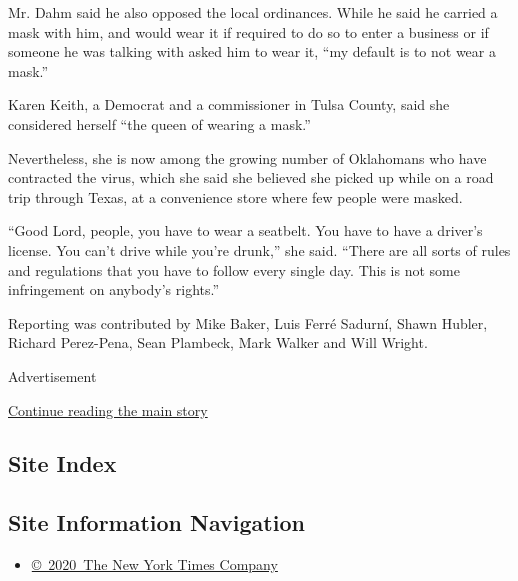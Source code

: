 Mr. Dahm said he also opposed the local ordinances. While he said he
carried a mask with him, and would wear it if required to do so to enter
a business or if someone he was talking with asked him to wear it, ``my
default is to not wear a mask.''

Karen Keith, a Democrat and a commissioner in Tulsa County, said she
considered herself ``the queen of wearing a mask.''

Nevertheless, she is now among the growing number of Oklahomans who have
contracted the virus, which she said she believed she picked up while on
a road trip through Texas, at a convenience store where few people were
masked.

``Good Lord, people, you have to wear a seatbelt. You have to have a
driver's license. You can't drive while you're drunk,'' she said.
``There are all sorts of rules and regulations that you have to follow
every single day. This is not some infringement on anybody's rights.''

Reporting was contributed by Mike Baker, Luis Ferré Sadurní, Shawn
Hubler, Richard Perez-Pena, Sean Plambeck, Mark Walker and Will Wright.

Advertisement

\protect\hyperlink{after-bottom}{Continue reading the main story}

\hypertarget{site-index}{%
\subsection{Site Index}\label{site-index}}

\hypertarget{site-information-navigation}{%
\subsection{Site Information
Navigation}\label{site-information-navigation}}

\begin{itemize}
\tightlist
\item
  \href{https://help.nytimes.com/hc/en-us/articles/115014792127-Copyright-notice}{©~2020~The
  New York Times Company}
\end{itemize}

